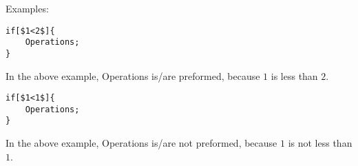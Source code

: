 \begin{itemize}
\begin{itemize}
Examples:
\begin{verbatim}
if[$1<2$]{
	Operations;
}
\end{verbatim}
\begin{center}
In the above example, Operations is/are preformed, because $1$ is less than $2$.
\end{center}
\begin{verbatim}
if[$1<1$]{
	Operations;
}
\end{verbatim}
\begin{center}
In the above example, Operations is/are not preformed, because $1$ is not less than $1$.
\end{center}
\end{itemize}
\end{itemize}
